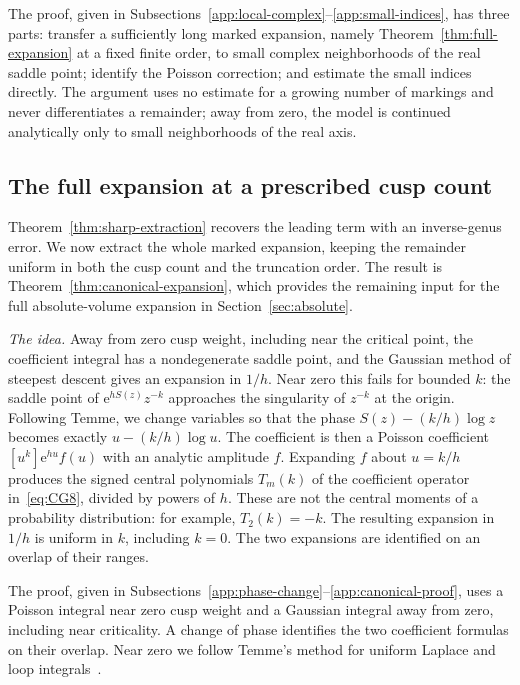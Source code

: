 The proof, given in Subsections~\ref{app:local-complex}--\ref{app:small-indices}, has three parts: transfer a sufficiently long marked expansion, namely Theorem~\ref{thm:full-expansion} at a fixed finite order, to small complex neighborhoods of the real saddle point; identify the Poisson correction; and estimate the small indices directly. The argument uses no estimate for a growing number of markings and never differentiates a remainder; away from zero, the model is continued analytically only to small neighborhoods of the real axis.

\subsection{The full expansion at a prescribed cusp count}\label{sec:canonical-expansion}

Theorem~\ref{thm:sharp-extraction} recovers the leading term with an inverse-genus error. We now extract the whole marked expansion, keeping the remainder uniform in both the cusp count and the truncation order. The result is Theorem~\ref{thm:canonical-expansion}, which provides the remaining input for the full absolute-volume expansion in Section~\ref{sec:absolute}.

\emph{The idea.} Away from zero cusp weight, including near the critical point, the coefficient integral has a nondegenerate saddle point, and the Gaussian method of steepest descent gives an expansion in $1/h$. Near zero this fails for bounded $k$: the saddle point of $\mathrm e^{hS(z)}z^{-k}$ approaches the singularity of $z^{-k}$ at the origin. Following Temme, we change variables so that the phase $S(z)-(k/h)\log z$ becomes exactly $u-(k/h)\log u$. The coefficient is then a Poisson coefficient $[u^k]\mathrm e^{hu}f(u)$ with an analytic amplitude $f$. Expanding $f$ about $u=k/h$ produces the signed central polynomials $T_m(k)$ of the coefficient operator in~\eqref{eq:CG8}, divided by powers of $h$. These are not the central moments of a probability distribution: for example, $T_2(k)=-k$. The resulting expansion in $1/h$ is uniform in $k$, including $k=0$. The two expansions are identified on an overlap of their ranges.

The proof, given in Subsections~\ref{app:phase-change}--\ref{app:canonical-proof}, uses a Poisson integral near zero cusp weight and a Gaussian integral away from zero, including near criticality. A change of phase identifies the two coefficient formulas on their overlap. Near zero we follow Temme's method for uniform Laplace and loop integrals~\cite[Sections~2.3 and~3.7]{Temme}.

